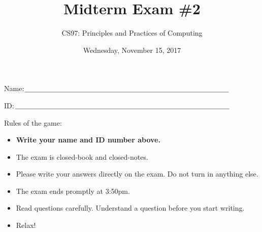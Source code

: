 \documentclass[11pt]{article}
\title{Midterm Exam \#2}
\author{CS97: Principles and Practices of Computing}
\date{Wednesday, November 15, 2017}
\begin{document}
  
\maketitle
\thispagestyle{empty}
\pagestyle{empty}

  \begin{flushright}
\end{flushright}

\vspace{.5in}

Name:$\underline{\mbox{\hspace{4in}}}$

\vspace{.5in}

ID:$\underline{\mbox{\hspace{4.2in}}}$

\vspace{0.5in}

Rules of the game:

\begin{itemize}
  \item {\bf Write your name and ID number above.}
\item The exam is closed-book and closed-notes.

\item Please write your answers
directly on the exam.  Do not turn in anything else.



  
\item The exam ends promptly at 3:50pm.
  
\item Read questions carefully.  Understand a question before you
  start writing. %

\item Relax!
\end{itemize}
\end{document}
